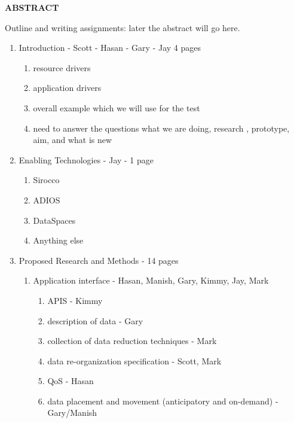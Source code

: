 \vspace{-\belowdisplayskip}
\vspace{-\abovedisplayskip}
\medskip

\begin{center}
\textbf{ABSTRACT}
\end{center}

\vspace{-\belowdisplayskip}

\enlargethispage{2\baselineskip}

\noindent
Outline and writing assignments:
later the abstract will go here.
\begin{enumerate}
\item Introduction - Scott - Hasan - Gary - Jay 4 pages
   \begin{enumerate}
      \item resource drivers
      \item application drivers
      \item overall example which we will use for the test
      \item  need to answer the questions what we are doing, research  , prototype, aim, and what is new
   \end{enumerate}
\item Enabling Technologies - Jay - 1 page
   \begin{enumerate}
   	\item Sirocco
   	\item ADIOS
   	\item DataSpaces
   	\item Anything else
   \end{enumerate}
 \item {Proposed Research and Methods} - 14 pages
    \begin{enumerate}
       \item Application interface - Hasan, Manish, Gary, Kimmy, Jay, Mark
          \begin{enumerate}
            \item APIS - Kimmy
            \item description of data - Gary
            \item collection of data reduction techniques - Mark
            \item data re-organization specification - Scott, Mark
            \item QoS - Hasan
            \item data placement and movement (anticipatory and on-demand)  - Gary/Manish

\end{enumerate}
\end{enumerate}
\end{enumerate}
